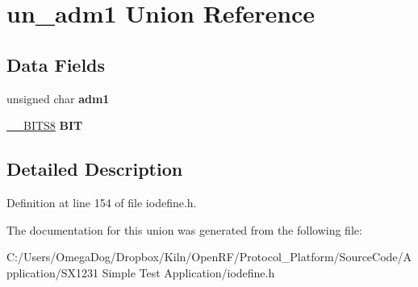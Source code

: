 \hypertarget{unionun__adm1}{\section{un\-\_\-adm1 Union Reference}
\label{unionun__adm1}
}
\subsection*{Data Fields}
\begin{DoxyCompactItemize}
\item 
\hypertarget{unionun__adm1_acc779d75753989bd0fcf317cf85a64b4}{unsigned char {\bfseries adm1}}\label{unionun__adm1_acc779d75753989bd0fcf317cf85a64b4}

\item 
\hypertarget{unionun__adm1_a94dcec94cdef6bac31f821b4fda5ecfa}{\hyperlink{struct_____b_i_t_s8}{\-\_\-\-\_\-\-B\-I\-T\-S8} {\bfseries B\-I\-T}}\label{unionun__adm1_a94dcec94cdef6bac31f821b4fda5ecfa}

\end{DoxyCompactItemize}


\subsection{Detailed Description}


Definition at line 154 of file iodefine.\-h.



The documentation for this union was generated from the following file\-:\begin{DoxyCompactItemize}
\item 
C\-:/\-Users/\-Omega\-Dog/\-Dropbox/\-Kiln/\-Open\-R\-F/\-Protocol\-\_\-\-Platform/\-Source\-Code/\-Application/\-S\-X1231 Simple Test Application/iodefine.\-h\end{DoxyCompactItemize}
